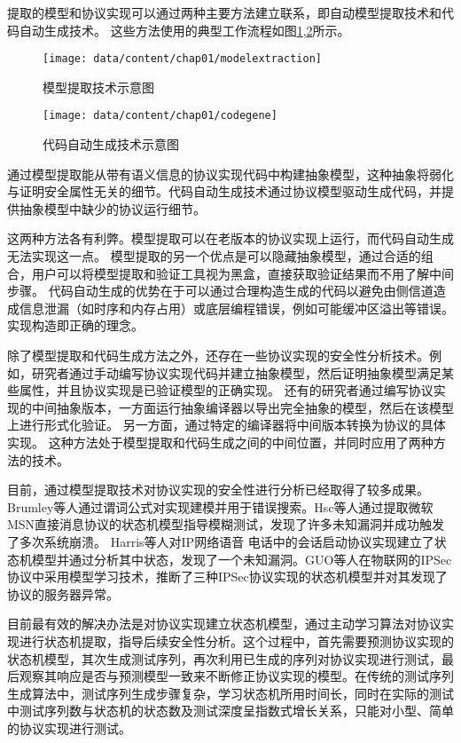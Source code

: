 提取的模型和协议实现可以通过两种主要方法建立联系，即自动模型提取技术和代码自动生成技术。 这些方法使用的典型工作流程如图\ref{fig-modelextraction},\ref{fig-codegene}所示。

\begin{figure}[htp]
\centering\texttt{[image: data/content/chap01/modelextraction]}
\caption{模型提取技术示意图}
\label{fig-modelextraction}
\end{figure}

\begin{figure}[htp]
\centering\texttt{[image: data/content/chap01/codegene]}
\caption{代码自动生成技术示意图}
\label{fig-codegene}
\end{figure}


通过模型提取能从带有语义信息的协议实现代码中构建抽象模型，这种抽象将弱化与证明安全属性无关的细节。代码自动生成技术通过协议模型驱动生成代码，并提供抽象模型中缺少的协议运行细节。

这两种方法各有利弊。模型提取可以在老版本的协议实现上运行，而代码自动生成无法实现这一点。 
模型提取的另一个优点是可以隐藏抽象模型，通过合适的组合，用户可以将模型提取和验证工具视为黑盒，直接获取验证结果而不用了解中间步骤。
代码自动生成的优势在于可以通过合理构造生成的代码以避免由侧信道造成信息泄漏（如时序和内存占用）或底层编程错误，例如可能缓冲区溢出等错误。实现构造即正确的理念。

除了模型提取和代码生成方法之外，还存在一些协议实现的安全性分析技术。例如，研究者通过手动编写协议实现代码并建立抽象模型，然后证明抽象模型满足某些属性，并且协议实现是已验证模型的正确实现\cite{abdulla2018model}。
还有的研究者通过编写协议实现的中间抽象版本，一方面运行抽象编译器以导出完全抽象的模型，然后在该模型上进行形式化验证。 另一方面，通过特定的编译器将中间版本转换为协议的具体实现。 这种方法处于模型提取和代码生成之间的中间位置，并同时应用了两种方法的技术。

目前，通过模型提取技术对协议实现的安全性进行分析已经取得了较多成果。
Brumley等人通过谓词公式对实现建模并用于错误搜索\cite{brumley2007towards}。Hsc等人通过提取微软MSN直接消息协议的状态机模型指导模糊测试，发现了许多未知漏洞并成功触发了多次系统崩溃\cite{Hsu2008a}。
Harris等人\cite{harris2009security}对IP网络语音
电话中的会话启动协议实现建立了状态机模型并通过分析其中状态，发现了一个未知漏洞。GUO等人在物联网的IPSec协议中采用模型学习技术，推断了三种IPSec协议实现的状态机模型并对其发现了协议的服务器异常\cite{8913552}。

目前最有效的解决办法是对协议实现建立状态机模型，通过主动学习算法对协议实现进行状态机提取，指导后续安全性分析。这个过程中，首先需要预测协议实现的状态机模型，其次生成测试序列，再次利用已生成的序列对协议实现进行测试，最后观察其响应是否与预测模型一致来不断修正协议实现的模型。在传统的测试序列生成算法中，测试序列生成步骤复杂，学习状态机所用时间长，同时在实际的测试中测试序列数与状态机的状态数及测试深度呈指数式增长关系，只能对小型、简单的协议实现进行测试。
